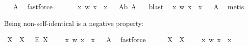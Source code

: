 \begin{isabellebody}
\isadelimproof
\ %
\endisadelimproof
%
\isatagproof
{}\isamarkupfalse%
\ A{}\ \isamarkupfalse%
\ fastforce%
\endisatagproof
{\isafoldproof}%
%
\isadelimproof
%
\endisadelimproof
\isanewline
\ \ \ \ \isanewline
{}\isamarkupfalse%
\ {\isachardoublequoteopen}{\isasymlfloor}{\isasymP}\ {\isacharparenleft}{\isasymlambda}x\ w{\isachardot}\ x\ {\isacharequal}\ x{\isacharparenright}{\isasymrfloor}{\isachardoublequoteclose}%
\isadelimproof
\ %
\endisadelimproof
%
\isatagproof
{}\isamarkupfalse%
\ A{}b\ A{}\ \ \isamarkupfalse%
\ blast%
\endisatagproof
{\isafoldproof}%
%
\isadelimproof
%
\endisadelimproof
\isanewline
{}\isamarkupfalse%
\ {\isachardoublequoteopen}{\isasymlfloor}{\isasymP}\ {\isacharparenleft}{\isasymlambda}x\ w{\isachardot}\ x\ {\isacharequal}\ x{\isacharparenright}{\isasymrfloor}{\isachardoublequoteclose}%
\isadelimproof
\ %
\endisadelimproof
%
\isatagproof
{}\isamarkupfalse%
\ A{}\ \isamarkupfalse%
\ metis%
\endisatagproof
{\isafoldproof}%
%
\isadelimproof
%
\endisadelimproof
%
\begin{isamarkuptext}%
Being non-self-identical is a negative property:%
\end{isamarkuptext}\isamarkuptrue%
\isamarkupfalse%
\ {\isachardoublequoteopen}{\isasymlfloor}{\isacharparenleft}\isactrlbold {\isasymexists}X{\isachardot}\ {\isasymP}\ X\ \ \isactrlbold {\isasymand}\ \isactrlbold {\isasymdiamond}\isactrlbold {\isasymexists}\isactrlsup E\ X{\isacharparenright}\ \isactrlbold {\isasymrightarrow}\ \ {\isasymP}\ {\isacharparenleft}\isactrlbold {\isasymrightharpoondown}\ {\isacharparenleft}{\isasymlambda}x\ w{\isachardot}\ {\isasymnot}x\ {\isacharequal}\ x{\isacharparenright}{\isacharparenright}{\isasymrfloor}{\isachardoublequoteclose}%
\isadelimproof
\ %
\endisadelimproof
%
\isatagproof
{}\isamarkupfalse%
\ A{}\ \isamarkupfalse%
\ fastforce%
\endisatagproof
{\isafoldproof}%
%
\isadelimproof
%
\endisadelimproof
\isanewline
\ \ \ \ \isanewline
{}\isamarkupfalse%
\ {\isachardoublequoteopen}{\isasymlfloor}{\isacharparenleft}\isactrlbold {\isasymexists}X{\isachardot}\ {\isasymP}\ X{\isacharparenright}\ \isactrlbold {\isasymrightarrow}\ \ {\isasymP}\ {\isacharparenleft}\isactrlbold {\isasymrightharpoondown}\ {\isacharparenleft}{\isasymlambda}x\ w{\isachardot}\ {\isasymnot}x\ {\isacharequal}\ x{\isacharparenright}{\isacharparenright}{\isasymrfloor}{\isachardoublequoteclose}%

\end{isabellebody}
